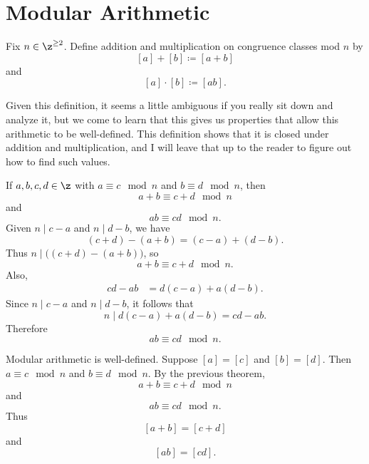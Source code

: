 
\section{Modular Arithmetic}

\begin{definition}
    Fix $n\in\z^{\geq 2}$.
    Define addition and multiplication on congruence classes mod $n$ by
    \[
        [a] + [b] \coloneqq [a + b]
    \]
    and
    \[
        [a]\cdot[b] \coloneqq [ab].
    \]
\end{definition}

Given this definition, it seems a little ambiguous if you really sit down and analyze it, but we come to learn that this gives us properties that allow this arithmetic to be well-defined.
This definition shows that it is closed under addition and multiplication, and I will leave that up to the reader to figure out how to find such values.

\begin{theorem}{
    If $a,b,c,d\in\z$ with $a\equiv c\mod n$ and $b\equiv d\mod n$, then
    \[
        a + b\equiv c+d\mod n
    \]
    and
    \[
        ab\equiv cd\mod n.
    \]
}
    Given $n\mid c-a$ and $n\mid d-b$, we have
    \[
        (c+d)-(a+b) = (c-a)+(d-b).
    \]
    Thus $n\mid \bigl((c+d)-(a+b)\bigr)$, so
    \[
        a+b\equiv c+d\mod n.
    \]
    Also,
    \begin{align*}
        cd-ab &= d(c-a)+a(d-b).
    \end{align*}
    Since $n\mid c-a$ and $n\mid d-b$, it follows that
    \[
        n\mid d(c-a)+a(d-b) = cd-ab.
    \]
    Therefore
    \[
        ab\equiv cd\mod n.
    \]
\end{theorem}

\begin{theorem}{
    Modular arithmetic is well-defined.
}
    Suppose $[a]=[c]$ and $[b]=[d]$.
    Then $a\equiv c\mod n$ and $b\equiv d\mod n$.
    By the previous theorem,
    \[
        a+b\equiv c+d\mod n
    \]
    and
    \[
        ab\equiv cd\mod n.
    \]
    Thus
    \[
        [a+b]=[c+d]
    \]
    and
    \[
        [ab]=[cd].
    \]
\end{theorem}


